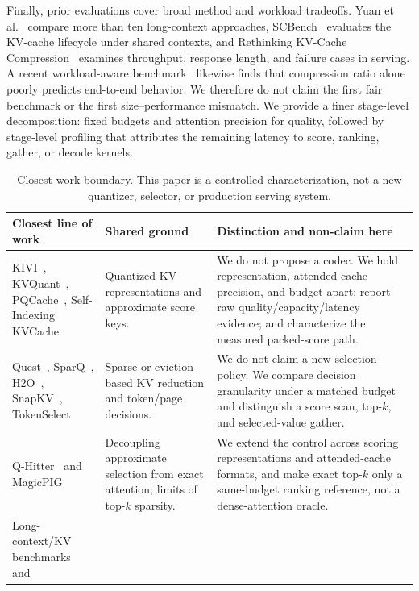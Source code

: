 \documentclass[sigplan,anonymous,review,nonacm]{acmart}
\begin{document}
Finally, prior evaluations cover broad method and workload tradeoffs.
Yuan et al.~\cite{yuan2024longctx} compare more than ten long-context approaches,
SCBench~\cite{li2025scbench} evaluates the KV-cache lifecycle under shared contexts,
and Rethinking KV-Cache Compression~\cite{wei2025rethinking} examines throughput,
response length, and failure cases in serving. A recent workload-aware
benchmark~\cite{agrawal2026benchmarking} likewise finds that compression ratio alone
poorly predicts end-to-end behavior. We therefore do not claim the first fair
benchmark or the first size--performance mismatch. We provide a finer stage-level
decomposition: fixed budgets and attention precision for quality, followed by
stage-level profiling that attributes the remaining latency to score, ranking,
gather, or decode kernels.

\begin{table}[t]
\centering\small
\caption{Closest-work boundary. This paper is a controlled characterization, not a
new quantizer, selector, or production serving system.}
\label{tab:closest-work}
\begin{tabular}{p{}p{}p{}}
\toprule
Closest line of work & Shared ground & Distinction and non-claim here \\
\midrule
KIVI~\cite{liu2024kivi}, KVQuant~\cite{hooper2024kvquant},
PQCache~\cite{zhang2025pqcache}, Self-Indexing KVCache~\cite{yang2026selfindexing}
& Quantized KV representations and approximate score keys.
& We do not propose a codec. We hold representation, attended-cache precision, and
budget apart; report raw quality/capacity/latency evidence; and characterize the
measured packed-score path. \\
Quest~\cite{tang2024quest}, SparQ~\cite{ribar2024sparq},
H2O~\cite{zhang2023h2o}, SnapKV~\cite{li2024snapkv}, TokenSelect~\cite{wu2025tokenselect}
& Sparse or eviction-based KV reduction and token/page decisions.
& We do not claim a new selection policy. We compare decision granularity under a
matched budget and distinguish a score scan, top-$k$, and selected-value gather. \\
Q-Hitter~\cite{zhang2024qhitter} and MagicPIG~\cite{chen2025magicpig}
& Decoupling approximate selection from exact attention; limits of top-$k$ sparsity.
& We extend the control across scoring representations and attended-cache formats,
and make exact top-$k$ only a same-budget ranking reference, not a dense-attention
oracle. \\
Long-context/KV benchmarks~\cite{yuan2024longctx,li2025scbench} and

\end{tabular}
\end{table}
\end{document}
